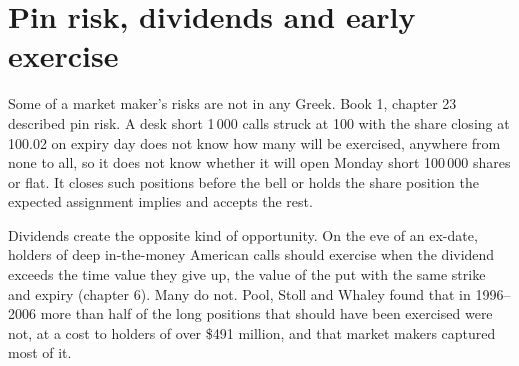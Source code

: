 \begin{omfigure}

\label{fig:dv:options-market-making-in-practice:bands}
\end{omfigure}

\section{Pin risk, dividends and early exercise}

Some of a market maker's risks are not in any Greek. Book 1, chapter 23 described pin risk. A desk short 1\,000 calls struck at 100 with the share closing
at 100.02 on expiry day does not know how many will be exercised, anywhere from none to all, so it does not know whether it will open Monday short
100\,000 shares or flat. It closes such positions before the bell or holds the share position the expected assignment implies and accepts the rest.

Dividends create the opposite kind of opportunity. On the eve of an ex-date, holders of deep in-the-money American calls should exercise when the dividend
exceeds the time value they give up, the value of the put with the same strike and expiry (chapter 6). Many do not. Pool, Stoll and Whaley found that in
1996--2006 more than half of the long positions that should have been exercised were not, at a cost to holders of over \$491 million, and that market
makers captured most of it.

